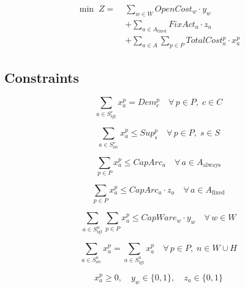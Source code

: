 \begin{align}
  \min\; Z = \;
  & \sum_{w \in W} OpenCost_w \cdot y_w \nonumber\\
  &+ \sum_{a \in A_{\text{fixed}}} FixAct_a \cdot z_a \nonumber\\
  &+ \sum_{a \in A}\sum_{p \in P} TotalCost_a^p \cdot x_a^p
  \label{eq:obj}
\end{align}

\subsection{Constraints}

\begin{equation}
  \sum_{a \in S_{\text{tgt}}^c} x_a^p = Dem_c^p
  \quad \forall\, p \in P,\; c \in C
  \label{eq:C1}
\end{equation}

\begin{equation}
  \sum_{a \in S_{\text{src}}^s} x_a^p \leq Sup_s^p
  \quad \forall\, p \in P,\; s \in S
  \label{eq:C2}
\end{equation}

\begin{equation}
  \sum_{p \in P} x_a^p \leq CapArc_a
  \quad \forall\, a \in A_{\text{always}}
  \label{eq:C3}
\end{equation}

\begin{equation}
  \sum_{p \in P} x_a^p \leq CapArc_a \cdot z_a
  \quad \forall\, a \in A_{\text{fixed}}
  \label{eq:C4}
\end{equation}

\begin{equation}
  \sum_{a \in S_{\text{tgt}}^w}\!\sum_{p \in P} x_a^p
  \leq CapWare_w \cdot y_w
  \quad \forall\, w \in W
  \label{eq:C5}
\end{equation}

\begin{equation}
  \sum_{a \in S_{\text{src}}^n} x_a^p
  = \sum_{a \in S_{\text{tgt}}^n} x_a^p
  \quad \forall\, p \in P,\; n \in W \cup H
  \label{eq:C6}
\end{equation}

\begin{equation}
  x_a^p \geq 0, \quad y_w \in \{0,1\}, \quad z_a \in \{0,1\}
  \label{eq:C8}
\end{equation}

